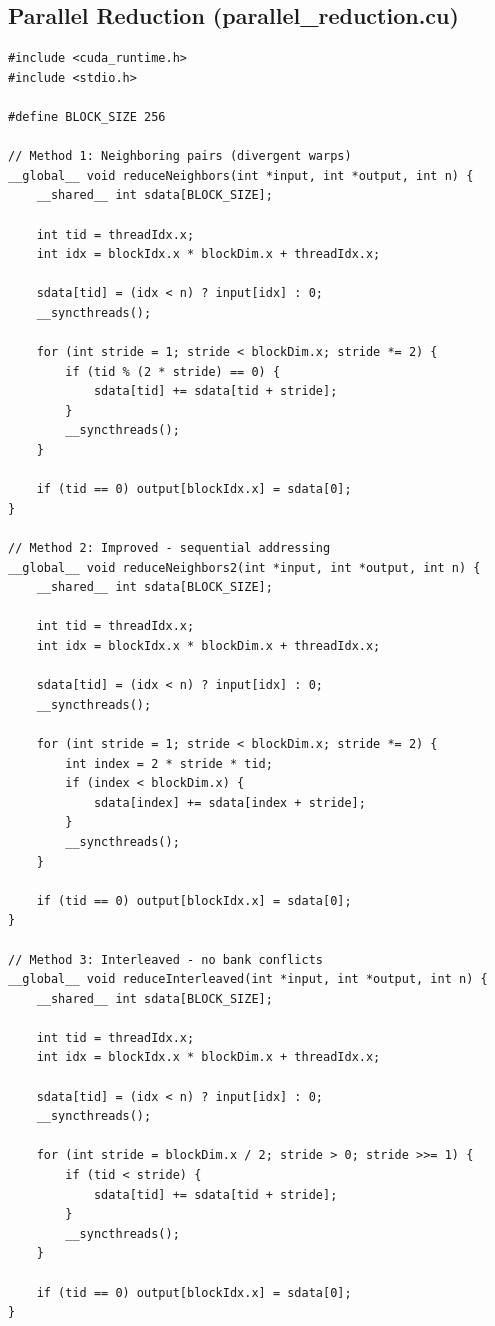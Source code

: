 \subsection{Parallel Reduction (parallel\_reduction.cu)}

\begin{lstlisting}[caption={Parallel Reduction - 3 Methods}]
#include <cuda_runtime.h>
#include <stdio.h>

#define BLOCK_SIZE 256

// Method 1: Neighboring pairs (divergent warps)
__global__ void reduceNeighbors(int *input, int *output, int n) {
    __shared__ int sdata[BLOCK_SIZE];
    
    int tid = threadIdx.x;
    int idx = blockIdx.x * blockDim.x + threadIdx.x;
    
    sdata[tid] = (idx < n) ? input[idx] : 0;
    __syncthreads();
    
    for (int stride = 1; stride < blockDim.x; stride *= 2) {
        if (tid % (2 * stride) == 0) {
            sdata[tid] += sdata[tid + stride];
        }
        __syncthreads();
    }
    
    if (tid == 0) output[blockIdx.x] = sdata[0];
}

// Method 2: Improved - sequential addressing
__global__ void reduceNeighbors2(int *input, int *output, int n) {
    __shared__ int sdata[BLOCK_SIZE];
    
    int tid = threadIdx.x;
    int idx = blockIdx.x * blockDim.x + threadIdx.x;
    
    sdata[tid] = (idx < n) ? input[idx] : 0;
    __syncthreads();
    
    for (int stride = 1; stride < blockDim.x; stride *= 2) {
        int index = 2 * stride * tid;
        if (index < blockDim.x) {
            sdata[index] += sdata[index + stride];
        }
        __syncthreads();
    }
    
    if (tid == 0) output[blockIdx.x] = sdata[0];
}

// Method 3: Interleaved - no bank conflicts
__global__ void reduceInterleaved(int *input, int *output, int n) {
    __shared__ int sdata[BLOCK_SIZE];
    
    int tid = threadIdx.x;
    int idx = blockIdx.x * blockDim.x + threadIdx.x;
    
    sdata[tid] = (idx < n) ? input[idx] : 0;
    __syncthreads();
    
    for (int stride = blockDim.x / 2; stride > 0; stride >>= 1) {
        if (tid < stride) {
            sdata[tid] += sdata[tid + stride];
        }
        __syncthreads();
    }
    
    if (tid == 0) output[blockIdx.x] = sdata[0];
}
\end{lstlisting}


